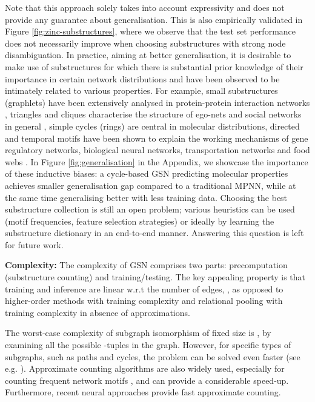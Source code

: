 \documentclass{article} \usepackage{iclr2021_conference,times}
\begin{document}
Note that this approach solely takes into account expressivity and does not provide any guarantee about generalisation. This is also empirically validated in Figure \ref{fig:zinc-substructures}, where we observe that the test set performance does not necessarily improve when choosing substructures with strong node disambiguation. In practice, aiming at better generalisation, it is desirable to make use of substructures for which there is substantial prior knowledge of their importance in certain network distributions and have been observed to be intimately related to various properties. For example, small substructures (graphlets) have been extensively analysed in protein-protein interaction networks \citep{prvzulj2004modeling}, triangles and cliques characterise the structure of ego-nets and social networks in general \citep{Granovetter82thestrength}, simple cycles (rings) are central in molecular distributions, directed and temporal motifs have been shown to explain the working mechanisms of gene regulatory networks, biological neural networks, transportation networks and food webs \citep{milo2002network, DBLP:conf/wsdm/ParanjapeBL17, benson2016higher}. In Figure \ref{fig:generalisation} in the Appendix, we showcase the importance of these inductive biases: a cycle-based GSN predicting molecular properties achieves smaller generalisation gap compared to a traditional MPNN, while at the same time generalising better with less training data. Choosing the best substructure collection is still an open problem; various heuristics can be used (motif frequencies, feature selection strategies) or ideally by learning the substructure dictionary in an end-to-end manner. Answering this question is left for future work.


\noindent\textbf{Complexity:} 
The complexity of GSN comprises two parts: precomputation (substructure counting) and training/testing. The key appealing property is that training and inference are linear w.r.t the number of edges, , as opposed to higher-order methods \citep{maron2019provably, morris2019weisfeiler} with  training complexity and relational pooling \citep{DBLP:conf/icml/Murphy0R019} with  training complexity in absence of approximations. 

The worst-case complexity of subgraph isomorphism of fixed size  is , by examining all the possible -tuples in the graph. However, for specific types of subgraphs, such as paths and cycles, the problem can be solved even faster (see e.g. \cite{DBLP:journals/algorithmica/GiscardKW19}). Approximate counting algorithms are also widely used, especially for counting frequent network motifs \citep{DBLP:journals/bioinformatics/KashtanIMA04, DBLP:conf/wabi/Wernicke05, DBLP:journals/tcbb/Wernicke06, DBLP:journals/bioinformatics/WernickeR06}, and can provide a considerable speed-up. Furthermore, recent neural approaches \citep{ying2020frequent, ying2020neural} provide fast approximate counting. 
\end{document}
